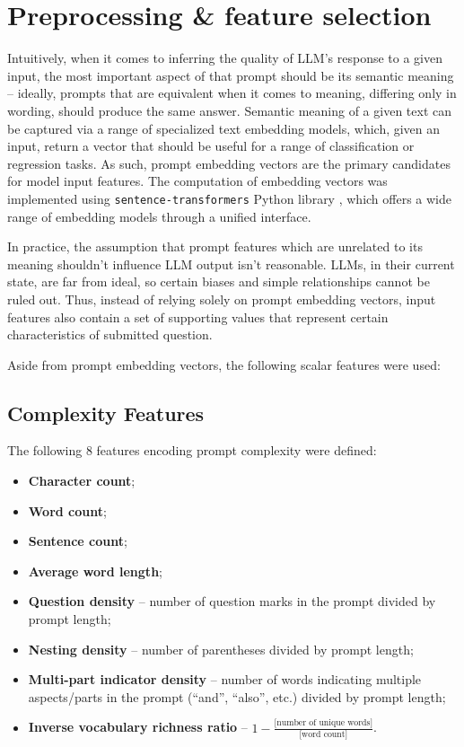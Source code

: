 \documentclass[a4paper,11pt,twoside]{report}
\theoremstyle{definition}
\begin{document}
\section{Preprocessing \& feature selection}
\label{section:preprocessing-and-features}

Intuitively, when it comes to inferring the quality of LLM's response to a given input, the most important aspect of that prompt should be its semantic meaning -- ideally, prompts that are equivalent when it comes to meaning, differing only in wording, should produce the same answer. Semantic meaning of a given text can be captured via a range of specialized text embedding models, which, given an input, return a vector that should be useful for a range of classification or regression tasks. As such, prompt embedding vectors are the primary candidates for model input features. The computation of embedding vectors was implemented using \texttt{sentence-transformers} Python library \cite{reimers2019sentencetransformers}, which offers a wide range of embedding models through a unified interface.

In practice, the assumption that prompt features which are unrelated to its meaning shouldn't influence LLM output isn't reasonable. LLMs, in their current state, are far from ideal, so certain biases and simple relationships cannot be ruled out. Thus, instead of relying solely on prompt embedding vectors, input features also contain a set of supporting values that represent certain characteristics of submitted question.

Aside from prompt embedding vectors, the following scalar features were used:

\subsection{Complexity Features}

The following 8 features encoding prompt complexity were defined:

\begin{itemize}
    \item \textbf{Character count};
    \item \textbf{Word count};
    \item \textbf{Sentence count};
    \item \textbf{Average word length};
    \item \textbf{Question density} -- number of question marks in the prompt divided by prompt length;
    \item \textbf{Nesting density} -- number of parentheses divided by prompt length;
    \item \textbf{Multi-part indicator density} -- number of words indicating multiple aspects/parts in the prompt (``and'', ``also'', etc.) divided by prompt length;
    \item \textbf{Inverse vocabulary richness ratio} -- $1 - \frac{\text{[number of unique words]}}{\text{[word count]}}$.
\end{itemize}
\end{document}
